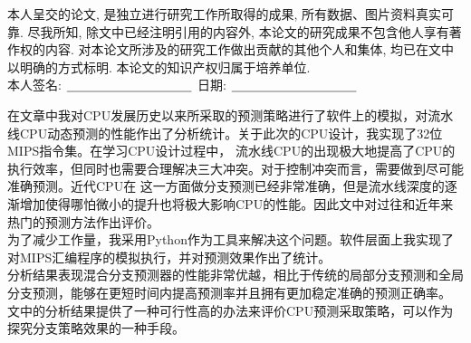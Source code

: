 {%

本人呈交的论文, 是独立进行研究工作所取得的成果,
所有数据、图片资料真实可靠. 尽我所知, 除文中已经注明引用的内容外,
本论文的研究成果不包含他人享有著作权的内容.
对本论文所涉及的研究工作做出贡献的其他个人和集体,
均已在文中以明确的方式标明. 本论文的知识产权归属于培养单位.\\[2cm]

\hspace*{1cm}本人签名: $\underline{\hspace{3.5cm}}$
\hspace{2cm}日期: $\underline{\hspace{3.5cm}}$\hfill\par}
\baselineskip=23pt  %





\begin{cnabstract}
在文章中我对CPU发展历史以来所采取的预测策略进行了软件上的模拟，对流水线CPU动态预测的性能作出了分析统计。关于此次的CPU设计，我实现了32位MIPS指令集。在学习CPU设计过程中，
流水线CPU的出现极大地提高了CPU的执行效率，但同时也需要合理解决三大冲突。对于控制冲突而言，需要做到尽可能准确预测。近代CPU在
这一方面做分支预测已经非常准确，但是流水线深度的逐渐增加使得哪怕微小的提升也将极大影响CPU的性能。因此文中对过往和近年来热门的预测方法作出评价。\\
为了减少工作量，我采用Python作为工具来解决这个问题。软件层面上我实现了对MIPS汇编程序的模拟执行，并对预测效果作出了统计。\\
分析结果表现混合分支预测器的性能非常优越，相比于传统的局部分支预测和全局分支预测，能够在更短时间内提高预测率并且拥有更加稳定准确的预测正确率。\\
文中的分析结果提供了一种可行性高的办法来评价CPU预测采取策略，可以作为探究分支策略效果的一种手段。


\end{cnabstract}
\par
\vspace*{2em}







